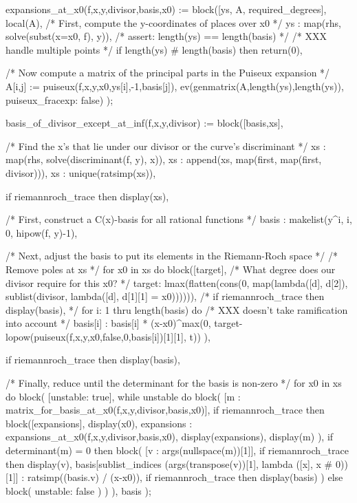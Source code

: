 \begin{maximacommonsmall}
expansions_at_x0(f,x,y,divisor,basis,x0) :=
 block([ys, A, required_degrees], local(A),
    /* First, compute the y-coordinates of places over x0 */
    ys : map(rhs, solve(subst(x=x0, f), y)),
    /* assert: length(ys) == length(basis) */
    /* XXX handle multiple points */
    if length(ys) # length(basis) then return(0),

    /* Now compute a matrix of the principal parts in the Puiseux expansion */
    A[i,j] := puiseux(f,x,y,x0,ys[i],-1,basis[j]),
    ev(genmatrix(A,length(ys),length(ys)), puiseux_fracexp: false)
);

basis_of_divisor_except_at_inf(f,x,y,divisor) :=
 block([basis,xs],

    /* Find the x's that lie under our divisor or the curve's discriminant */
    xs : map(rhs, solve(discriminant(f, y), x)),
    xs : append(xs, map(first, map(first, divisor))),
    xs : unique(ratsimp(xs)),

    if riemannroch_trace then display(xs),

    /* First, construct a C(x)-basis for all rational functions */
    basis : makelist(y^i, i, 0, hipow(f, y)-1),

    /* Next, adjust the basis to put its elements in the Riemann-Roch space */
    /* Remove poles at xs */
    for x0 in xs do block([target],
      /* What degree does our divisor require for this x0? */
      target: lmax(flatten(cons(0, map(lambda([d], d[2]), sublist(divisor, lambda([d], d[1][1] = x0)))))),
      /* if riemannroch_trace then display(basis), */
      for i: 1 thru length(basis) do
        /* XXX doesn't take ramification into account */
        basis[i] : basis[i] * (x-x0)^max(0, target-lopow(puiseux(f,x,y,x0,false,0,basis[i])[1][1], t))
    ),

    if riemannroch_trace then display(basis),

    /* Finally, reduce until the determinant for the basis is non-zero */
    for x0 in xs do block(
      [unstable: true],
      while unstable do block(
        [m : matrix_for_basis_at_x0(f,x,y,divisor,basis,x0)],
        if riemannroch_trace then block([expansions],
           display(x0),
           expansions : expansions_at_x0(f,x,y,divisor,basis,x0),
           display(expansions),
           display(m)
        ),
        if determinant(m) = 0 then block(
          [v : args(nullspace(m))[1]],
          if riemannroch_trace then display(v),
          basis[sublist_indices (args(transpose(v))[1], lambda ([x], x # 0))[1]] : ratsimp((basis.v) / (x-x0)),
          if riemannroch_trace then display(basis)
        ) else block(
          unstable: false
        )
      )
    ),
    basis
);


\end{maximacommonsmall}
